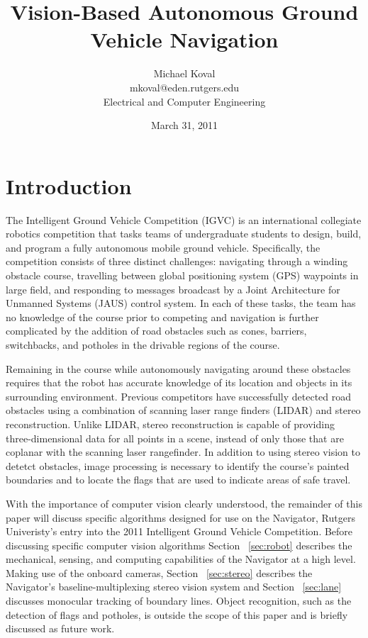 \documentclass[11pt,twocolumn]{article}
\title{Vision-Based Autonomous Ground Vehicle Navigation}
\date{March 31, 2011}
\author{
	Michael Koval \\
	mkoval@eden.rutgers.edu \\
	Electrical and Computer Engineering
}
\begin{document}
\maketitle

\section{Introduction}
\label{sec:intro}
The Intelligent Ground Vehicle Competition (IGVC) is an international collegiate
robotics competition that tasks teams of undergraduate students to design,
build, and program a fully autonomous mobile ground vehicle. Specifically, the
competition consists of three distinct challenges: navigating through a winding
obstacle course, travelling between global positioning system (GPS) waypoints in
large field, and responding to messages broadcast by a Joint Architecture for
Unmanned Systems (JAUS) control system. In each of these tasks, the team has no
knowledge of the course prior to competing and navigation is further complicated
by the addition of road obstacles such as cones, barriers, switchbacks, and
potholes in the drivable regions of the course.

Remaining in the course while autonomously navigating around these obstacles
requires that the robot has accurate knowledge of its location and objects in
its surrounding environment. Previous competitors have successfully detected
road obstacles using a combination of scanning laser range finders (LIDAR) and
stereo reconstruction. Unlike LIDAR, stereo reconstruction is capable of
providing three-dimensional data for all points in a scene, instead of only
those that are coplanar with the scanning laser rangefinder. In addition to
using stereo vision to detetct obstacles, image processing is necessary to
identify the course's painted boundaries and to locate the flags that are used
to indicate areas of safe travel.

With the importance of computer vision clearly understood, the remainder of this
paper will discuss specific algorithms designed for use on the Navigator,
Rutgers Univeristy's entry into the 2011 Intelligent Ground Vehicle Competition.
Before discussing specific computer vision algorithms Section ~\ref{sec:robot}
describes the mechanical, sensing, and computing capabilities of the Navigator
at a high level. Making use of the onboard cameras, Section ~\ref{sec:stereo}
describes the Navigator's baseline-multiplexing stereo vision system and Section
~\ref{sec:lane} discusses monocular tracking of boundary lines. Object
recognition, such as the detection of flags and potholes, is outside the scope
of this paper and is briefly discussed as future work.
\end{document}
